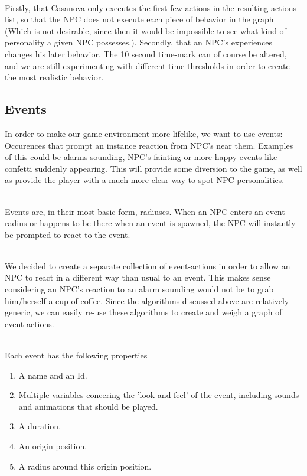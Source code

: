 \documentclass[11pt]{article} %
\begin{document}
~\\
Firstly, that Casanova only executes the first few actions in the resulting actions list, so that the NPC does not execute each piece of behavior in the graph (Which is not desirable, since then it would be impossible to see what kind of personality a given NPC possesses.). 
Secondly, that an NPC's experiences changes his later behavior. %
The 10 second time-mark can of course be altered, and we are still experimenting with different time thresholds in order to create the most realistic behavior.


\newpage
\subsection{Events}
In order to make our game environment more lifelike, we want to use events: Occurences that prompt an instance reaction from NPC's near them. Examples of this could be alarms sounding, NPC's fainting or more happy events like confetti suddenly appearing. This will provide some diversion to the game, as well as provide the player with a much more clear way to spot NPC personalities.

~\\
Events are, in their most basic form, radiuses. When an NPC enters an event radius or happens to be there when an event is spawned, the NPC will instantly be prompted to react to the event.

~\\
We decided to create a separate collection of event-actions in order to allow an NPC to react in a different way than usual to an event. This makes sense considering an NPC's reaction to an alarm sounding would not be to grab him/herself a cup of coffee.
Since the algorithms discussed above are relatively generic, we can easily re-use these algorithms to create and weigh a graph of event-actions. 

~\\
Each event has the following properties 

\begin{enumerate}
\item A name and an Id.
\item Multiple variables concering the 'look and feel' of the event, including sounds and animations that should be played.
\item A duration.
\item An origin position.
\item A radius around this origin position.
\end{enumerate}
\end{document}
